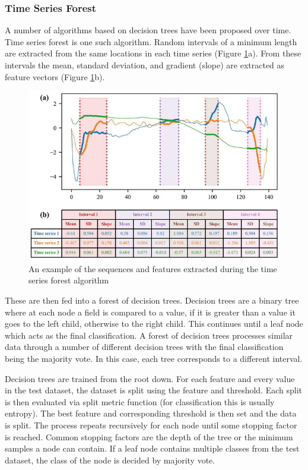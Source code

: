 \subsubsection{Time Series Forest}

A number of algorithms based on decision trees have been proposed over time. Time series forest\cite{deng2013time} is one such algorithm. Random intervals of a minimum length are extracted from the same locations in each time series (Figure \ref{fig:time-series-forest}a). From these intervals the mean, standard deviation, and gradient (slope) are extracted as feature vectors (Figure \ref{fig:time-series-forest}b).

\begin{figure}[h]
    \centering
    \includegraphics[width=0.5\linewidth]{dissertation//figures/time-series-forest.png}
    \caption{An example of the sequences and features extracted during the time series forest algorithm}
    \label{fig:time-series-forest}
\end{figure}

These are then fed into a forest of decision trees\cite{breiman2001random}. Decision trees are a binary tree where at each node a field is compared to a value, if it is greater than a value it goes to the left child, otherwise to the right child. This continues until a leaf node which acts as the final classification. A forest of decision trees processes similar data through a number of different decision trees with the final classification being the majority vote. In this case, each tree corresponds to a different interval.

Decision trees are trained from the root down. For each feature and every value in the test dataset, the dataset is split using the feature and threshold. Each split is then evaluated via split metric function (for classification this is usually entropy). The best feature and corresponding threshold is then set and the data is split. The process repeats recursively for each node until some stopping factor is reached. Common stopping factors are the depth of the tree or the minimum samples a node can contain. If a leaf node contains multiple classes from the test dataset, the class of the node is decided by majority vote.

